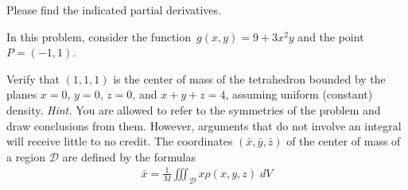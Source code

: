 \begin{questions}
    \question[16] Please find the indicated partial derivatives.



    \question In this problem, consider the function~$g(x,y) = 9 + 3x^2y$ and the point~$P = (-1,1)$. 


    \question[16] Verify that $(1,1,1)$ is the center of mass of the tetrahedron bounded by the planes $x = 0$, $y = 0$, $z = 0$, and $x + y + z = 4$, assuming uniform (constant) density. \emph{Hint.} You are allowed to refer to the symmetries of the problem and draw conclusions from them. However, arguments that do not involve an integral will receive little to no credit. The coordinates $(\bar{x}, \bar{y}, \bar{z})$ of the center of mass of a region $\mathcal{D}$ are defined by the formulas
    \begin{align*}
        \bar{x} = \frac{1}{M} \iiint_{\mathcal{D}} x \rho(x,y,z) \; dV
    \end{align*}


\end{questions}
